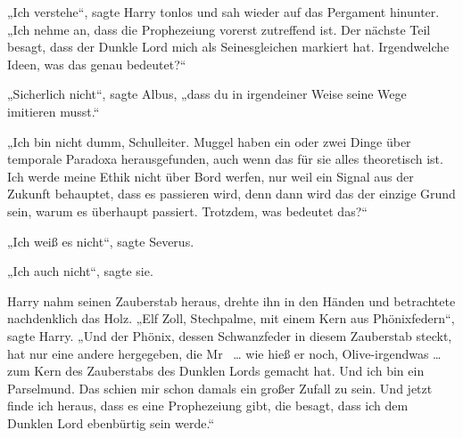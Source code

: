 „Ich verstehe“, sagte Harry tonlos und sah wieder auf das Pergament hinunter.
„Ich nehme an, dass die Prophezeiung vorerst zutreffend ist. Der nächste Teil besagt, dass der Dunkle Lord mich als Seinesgleichen markiert hat. Irgendwelche Ideen, was das genau bedeutet?“

„Sicherlich nicht“, sagte Albus, „dass du in irgendeiner Weise seine Wege imitieren musst.“

„Ich bin nicht dumm, Schulleiter. Muggel haben ein oder zwei Dinge über temporale Paradoxa herausgefunden, auch wenn das für sie alles theoretisch ist. Ich werde meine Ethik nicht über Bord werfen, nur weil ein Signal aus der Zukunft behauptet, dass es passieren wird, denn dann wird das der einzige Grund sein, warum es überhaupt passiert. Trotzdem, was bedeutet das?“

„Ich weiß es nicht“, sagte Severus.

„Ich auch nicht“, sagte sie.

Harry nahm seinen Zauberstab heraus, drehte ihn in den Händen und betrachtete nachdenklich das Holz.
„Elf Zoll, Stechpalme, mit einem Kern aus Phönixfedern“, sagte Harry.
„Und der Phönix, dessen Schwanzfeder in diesem Zauberstab steckt, hat nur eine andere hergegeben, die Mr~ … wie hieß er noch, Olive-irgendwas … zum Kern des Zauberstabs des Dunklen Lords gemacht hat. Und ich bin ein Parselmund. Das schien mir schon damals ein großer Zufall zu sein. Und jetzt finde ich heraus, dass es eine Prophezeiung gibt, die besagt, dass ich dem Dunklen Lord ebenbürtig sein werde.“

